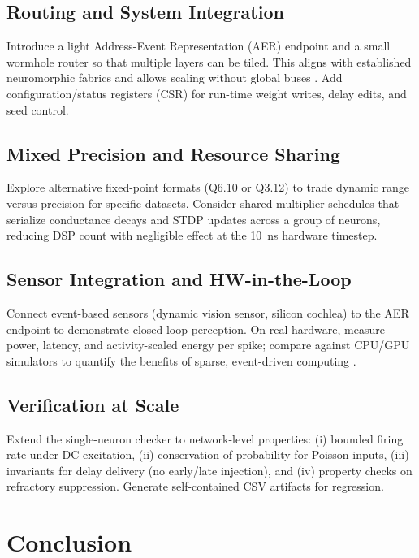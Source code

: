 \documentclass[10pt,onecolumn]{IEEEtran}
\begin{document}
\subsection{Routing and System Integration}
Introduce a light Address-Event Representation (AER) endpoint and a small wormhole router so that multiple layers can be tiled. This aligns with established neuromorphic fabrics and allows scaling without global buses \cite{Mead1990,IndiveriLiu2015}. Add configuration/status registers (CSR) for run-time weight writes, delay edits, and seed control.

\subsection{Mixed Precision and Resource Sharing}
Explore alternative fixed-point formats (Q6.10 or Q3.12) to trade dynamic range versus precision for specific datasets. Consider shared-multiplier schedules that serialize conductance decays and STDP updates across a group of neurons, reducing DSP count with negligible effect at the 10~ns hardware timestep.

\subsection{Sensor Integration and HW-in-the-Loop}
Connect event-based sensors (dynamic vision sensor, silicon cochlea) to the AER endpoint to demonstrate closed-loop perception. On real hardware, measure power, latency, and activity-scaled energy per spike; compare against CPU/GPU simulators to quantify the benefits of sparse, event-driven computing \cite{Furber2014,Merolla2014,Davies2018}.

\subsection{Verification at Scale}
Extend the single-neuron checker to network-level properties: (i) bounded firing rate under DC excitation, (ii) conservation of probability for Poisson inputs, (iii) invariants for delay delivery (no early/late injection), and (iv) property checks on refractory suppression. Generate self-contained CSV artifacts for regression.

\section{Conclusion}
\label{sec:conclusion}
\end{document}
